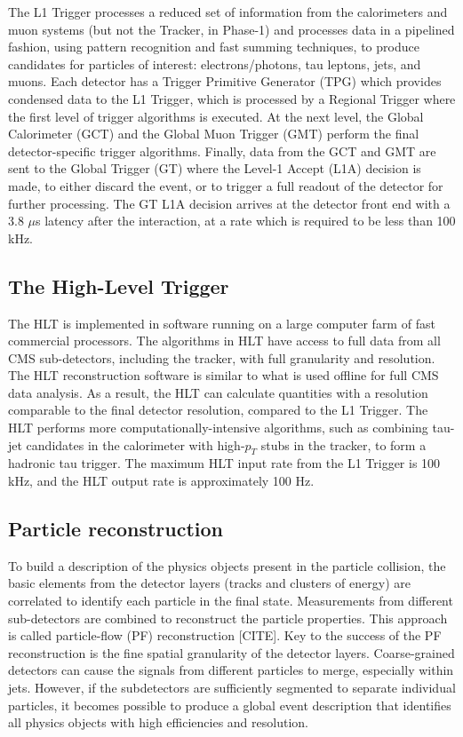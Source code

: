 \documentclass{article}
\begin{document}
The L1 Trigger processes a reduced set of information from the calorimeters and muon systems (but not the Tracker, in Phase-1) and processes data in a pipelined fashion, using pattern recognition and fast summing techniques, to produce candidates for particles of interest: electrons/photons, tau leptons, jets, and muons. Each detector has a Trigger Primitive Generator (TPG) which provides condensed data to the L1 Trigger, which is processed by a Regional Trigger where the first level of trigger algorithms is executed. At the next level, the Global Calorimeter (GCT) and the Global Muon Trigger (GMT) perform the final detector-specific trigger algorithms. Finally, data from the GCT and GMT are sent to the Global Trigger (GT) where the Level-1 Accept (L1A) decision is made, to either discard the event, or to trigger a full readout of the detector for further processing. The GT L1A decision arrives at the detector front end with a 3.8 $\mu$s latency after the interaction, at a rate which is required to be less than 100 kHz.


\subsection{The High-Level Trigger}
\label{section:phase-1-high-level-trigger}
The HLT is implemented in software running on a large computer farm of fast commercial processors. The algorithms in HLT have access to full data from all CMS sub-detectors, including the tracker, with full granularity and resolution. The HLT reconstruction software is similar to what is used offline for full CMS data analysis. As a result, the HLT can calculate quantities with a resolution comparable to the final detector resolution, compared to the L1 Trigger. The HLT performs more computationally-intensive algorithms, such as combining tau-jet candidates in the calorimeter with high-$p_T$ stubs in the tracker, to form a hadronic tau trigger. The maximum HLT input rate from the L1 Trigger is 100 kHz, and the HLT output rate is approximately 100 Hz. 

\subsection{Particle reconstruction}
To build a description of the physics objects present in the particle collision, the basic elements from the detector layers (tracks and clusters of energy) are correlated to identify each particle in the final state. Measurements from different sub-detectors are combined to reconstruct the particle properties. This approach is called particle-flow (PF) reconstruction [CITE]. Key to the success of the PF reconstruction is the fine spatial granularity of the detector layers. Coarse-grained detectors can cause the signals from different particles to merge, especially within jets. However, if the subdetectors are sufficiently segmented to separate individual particles, it becomes possible to produce a global event description that identifies all physics objects with high efficiencies and resolution.
\end{document}
